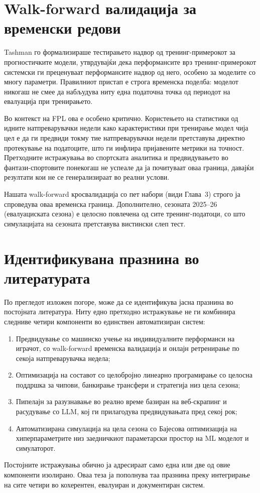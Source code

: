 \section{Walk-forward валидација за временски редови}

Tashman \cite{tashman2000out} го формализираше тестирањето надвор од тренинг-примерокот за прогностичките модели, утврдувајќи дека перформансите врз тренинг-примерокот системски ги преценуваат перформансите надвор од него, особено за моделите со многу параметри. Правилниот пристап е строга временска поделба: моделот никогаш не смее да набљудува ниту една податочна точка од периодот на евалуација при тренирањето.

Во контекст на FPL ова е особено критично. Користењето на статистики од идните натпреварувачки недели како карактеристики при тренирање модел чија цел е да ги предвиди токму тие натпреварувачки недели претставува директно протекување на податоците, што ги инфлира пријавените метрики на точност. Претходните истражувања во спортската аналитика и предвидувањето во фантази-спортовите понекогаш не успеале да ја почитуваат оваа граница, давајќи резултати кои не се генерализираат во реални услови.

Нашата walk-forward кросвалидација со пет набори (види Глава~3) строго ја спроведува оваа временска граница. Дополнително, сезоната 2025--26 (евалуациската сезона) е целосно повлечена од сите тренинг-податоци, со што симулацијата на сезоната претставува вистински слеп тест.

\section{Идентификувана празнина во литературата}

По прегледот изложен погоре, може да се идентификува јасна празнина во постојната литература. Ниту едно претходно истражување не ги комбинира следниве четири компоненти во единствен автоматизиран систем:

\begin{enumerate}
  \item Предвидување со машинско учење на индивидуалните перформанси на играчот, со walk-forward временска валидација и онлајн ретренирање по секоја натпреварувачка недела;
  \item Оптимизација на составот со целобројно линеарно програмирање со целосна поддршка за чипови, банкирање трансфери и стратегија низ цела сезона;
  \item Пипелајн за разузнавање во реално време базиран на веб-скрапинг и расудување со LLM, кој ги прилагодува предвидувањата пред секој рок;
  \item Автоматизирана симулација на цела сезона со Бајесова оптимизација на хиперпараметрите низ заедничкиот параметарски простор на ML моделот и симулаторот.
\end{enumerate}

Постојните истражувања обично ја адресираат само една или две од овие компоненти изолирано. Оваа теза ја пополнува таа празнина преку интегрирање на сите четири во кохерентен, евалуиран и документиран систем.
